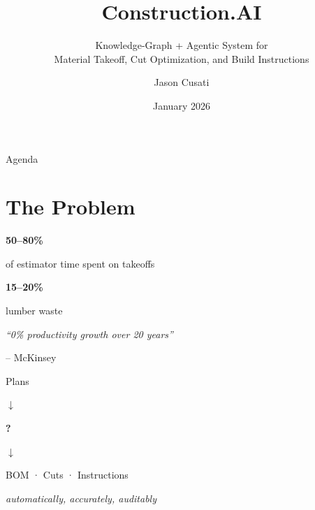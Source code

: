 \documentclass[11pt,aspectratio=169]{beamer}
\title{Construction.AI}
\subtitle{Knowledge-Graph + Agentic System for\\Material Takeoff, Cut Optimization, and Build Instructions}
\author{Jason Cusati}
\institute{Virginia Tech}
\date{January 2026}
\begin{document}
\begin{frame}
\titlepage
\end{frame}

\begin{frame}{Agenda}
\tableofcontents
\end{frame}

\section{The Problem}

\begin{frame}{}
\centering
\vspace{2em}
{\Huge \textbf{50--80\%}}

\vspace{1em}
{\large of estimator time spent on takeoffs}

\vspace{3em}
{\Huge \textbf{15--20\%}}

\vspace{1em}
{\large lumber waste}

\vspace{3em}
\textit{``0\% productivity growth over 20 years''}

\vspace{0.5em}
\small -- McKinsey
\end{frame}

\begin{frame}{}
\centering
\vspace{2em}
{\Large Plans}

\vspace{1em}
\Huge $\downarrow$

\vspace{1em}
{\Large \textcolor{vtorange}{\textbf{?}}}

\vspace{1em}
\Huge $\downarrow$

\vspace{1em}
{\Large BOM · Cuts · Instructions}

\vspace{2em}
{\large \textit{automatically, accurately, auditably}}
\end{frame}
\end{document}
